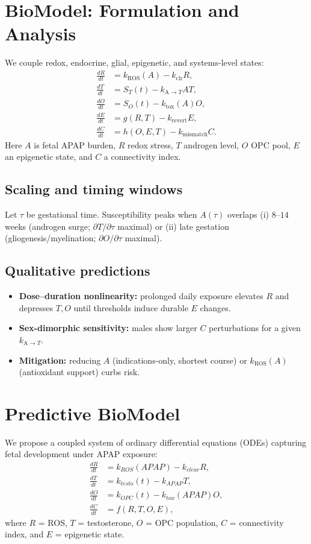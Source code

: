 \documentclass[12pt]{article}
\begin{document}
\section{BioModel: Formulation and Analysis}
We couple redox, endocrine, glial, epigenetic, and systems-level states:
\begin{align}
\frac{dR}{dt} &= k_{\mathrm{ROS}}(A) - k_{\mathrm{clr}} R, \\
\frac{dT}{dt} &= S_{T}(t) - k_{\mathrm{A}\to T} A T, \\
\frac{dO}{dt} &= S_{O}(t) - k_{\mathrm{tox}}(A) O, \\
\frac{dE}{dt} &= g(R,T) - k_{\mathrm{revert}} E, \\
\frac{dC}{dt} &= h(O,E,T) - k_{\mathrm{mismatch}} C.
\end{align}
Here $A$ is fetal APAP burden, $R$ redox stress, $T$ androgen level,
$O$ OPC pool, $E$ an epigenetic state, and $C$ a connectivity index.

\subsection{Scaling and timing windows}
Let $\tau$ be gestational time. Susceptibility peaks when $A(\tau)$ overlaps
(i) $8$--$14$ weeks (androgen surge; $\partial T/\partial \tau$ maximal) or
(ii) late gestation (gliogenesis/myelination; $\partial O/\partial \tau$ maximal).

\subsection{Qualitative predictions}
\begin{itemize}
  \item \textbf{Dose--duration nonlinearity:} prolonged daily exposure
        elevates $R$ and depresses $T,O$ until thresholds induce durable $E$ changes.
  \item \textbf{Sex-dimorphic sensitivity:} males show larger $C$ perturbations
        for a given $k_{\mathrm{A}\to T}$.
  \item \textbf{Mitigation:} reducing $A$ (indications-only, shortest course) or
        $k_{\mathrm{ROS}}(A)$ (antioxidant support) curbs risk.
\end{itemize}


\section{Predictive BioModel}
We propose a coupled system of ordinary differential equations (ODEs) capturing fetal development under APAP exposure:
\begin{align}
\frac{dR}{dt} &= k_{ROS}(APAP) - k_{clear}R, \\
\frac{dT}{dt} &= k_{testo}(t) - k_{APAP}T, \\
\frac{dO}{dt} &= k_{OPC}(t) - k_{tox}(APAP)O, \\
\frac{dC}{dt} &= f(R,T,O,E),
\end{align}
where $R$ = ROS, $T$ = testosterone, $O$ = OPC population, $C$ = connectivity index, and $E$ = epigenetic state. 
\end{document}
